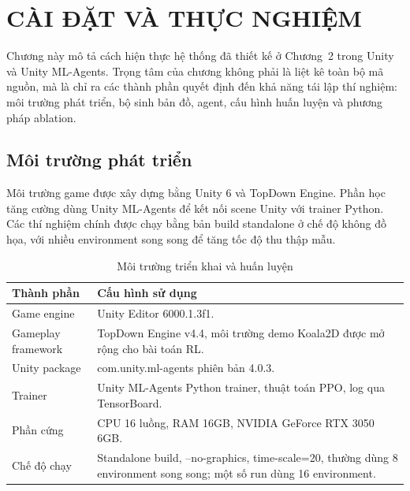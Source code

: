 \clearpage
{}

\setcounter{chapter}{2}
\chapter[CÀI ĐẶT VÀ THỰC NGHIỆM]{CÀI ĐẶT VÀ THỰC NGHIỆM}

Chương này mô tả cách hiện thực hệ thống đã thiết kế ở Chương~2 trong Unity và Unity ML-Agents. Trọng tâm của chương không phải là liệt kê toàn bộ mã nguồn, mà là chỉ ra các thành phần quyết định đến khả năng tái lập thí nghiệm: môi trường phát triển, bộ sinh bản đồ, agent, cấu hình huấn luyện và phương pháp ablation.

\section{Môi trường phát triển}

Môi trường game được xây dựng bằng Unity 6 và TopDown Engine. Phần học tăng cường dùng Unity ML-Agents để kết nối scene Unity với trainer Python. Các thí nghiệm chính được chạy bằng bản build standalone ở chế độ không đồ họa, với nhiều environment song song để tăng tốc độ thu thập mẫu.

\begin{table}[H]
    \centering
    \small
    \caption{Môi trường triển khai và huấn luyện}
    \label{tab:development_environment}
    \begin{tabular}{|p{5cm}|p{8cm}|}
        \hline
        \textbf{Thành phần} & \textbf{Cấu hình sử dụng} \\
        \hline
        Game engine & Unity Editor 6000.1.3f1. \\
        \hline
        Gameplay framework & TopDown Engine v4.4, môi trường demo Koala2D được mở rộng cho bài toán RL. \\
        \hline
        Unity package & com.unity.ml-agents phiên bản 4.0.3. \\
        \hline
        Trainer & Unity ML-Agents Python trainer, thuật toán PPO, log qua TensorBoard. \\
        \hline
        Phần cứng & CPU 16 luồng, RAM 16GB, NVIDIA GeForce RTX 3050 6GB. \\
        \hline
        Chế độ chạy & Standalone build, --no-graphics, time-scale=20, thường dùng 8 environment song song; một số run dùng 16 environment. \\
        \hline
    \end{tabular}
\end{table}

